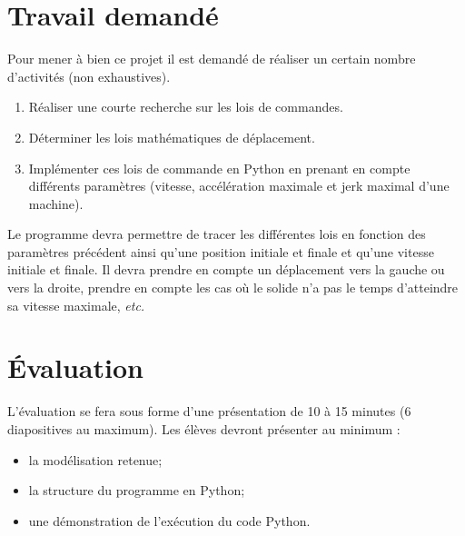 \documentclass[10pt]{article}
\newif\ifprof
\begin{document}
\section{Travail demandé}
Pour mener à bien ce projet il est demandé de réaliser un certain nombre d'activités (non exhaustives).
\begin{enumerate}
\item Réaliser une courte recherche sur les lois de commandes. 
\item Déterminer les lois mathématiques de déplacement.
\item Implémenter ces lois de commande en Python en prenant en compte différents paramètres (vitesse, accélération maximale et jerk maximal d'une machine).
\end{enumerate}

Le programme devra permettre de tracer les différentes lois en fonction des paramètres précédent ainsi qu'une position initiale et finale et qu'une vitesse initiale et finale. Il devra prendre en compte un déplacement vers la gauche ou vers la droite, prendre en compte les cas où le solide n'a pas le temps d'atteindre sa vitesse maximale, \textit{etc.}




\section{Évaluation}
L'évaluation se fera sous forme d'une présentation de 10 à 15 minutes (6 diapositives au maximum). Les élèves devront présenter au minimum : 
\begin{itemize}
\item la modélisation retenue;
\item la structure du programme en Python;
\item une démonstration de l'exécution du code Python.
\end{itemize}


\ifprof
\section{Éléments de corrigé}


\else

\fi
\end{document}
